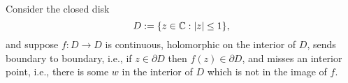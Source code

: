 \documentclass{homework}
\begin{document}
                                                                                                                                                                                                                                                                                                        \begin{problem}
                                                                                                                                                                                                                                                                                                          Consider the closed disk
                                                                                                                                                                                                                                                                                                            \[
                                                                                                                                                                                                                                                                                                                D := \{ z \in \mathbb{C} : \left|z\right| \leq 1 \},
                                                                                                                                                                                                                                                                                                                  \]
                                                                                                                                                                                                                                                                                                                    and suppose $f : D \to D$ is continuous, holomorphic on the interior
                                                                                                                                                                                                                                                                                                                      of $D$, sends boundary to boundary, i.e., if $z \in \partial D$ then
                                                                                                                                                                                                                                                                                                                        $f(z) \in \partial D$, and misses an interior point, i.e., there is
                                                                                                                                                                                                                                                                                                                          some $w$ in the interior of $D$ which is not in the image of $f$.


\end{problem}
\end{document}
